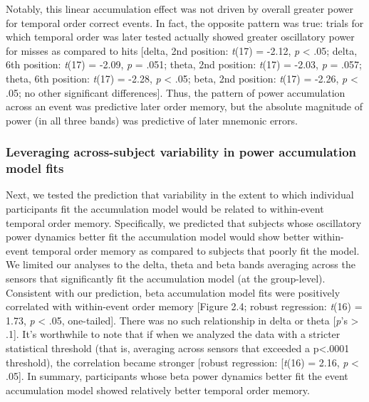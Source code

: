 Notably, this linear accumulation effect was not driven by overall
greater power for temporal order correct events. In fact, the opposite
pattern was true: trials for which temporal order was later tested
actually showed greater oscillatory power for misses as compared to hits
{[}delta, 2nd position: \emph{t}(17) = -2.12, \emph{p} \textless{} .05;
delta, 6th position: \emph{t}(17) = -2.09, \emph{p} = .051; theta, 2nd
position: \emph{t}(17) = -2.03, \emph{p} = .057; theta, 6th position:
\emph{t}(17) = -2.28, \emph{p} \textless{} .05; beta, 2nd position:
\emph{t}(17) = -2.26, \emph{p} \textless{} .05; no other significant
differences{]}. Thus, the pattern of power accumulation across an event
was predictive later order memory, but the absolute magnitude of power
(in all three bands) was predictive of later mnemonic errors.

\subsubsection{Leveraging across-subject variability in power
accumulation model
fits}\label{leveraging-across-subject-variability-in-power-accumulation-model-fits}

Next, we tested the prediction that variability in the extent to which
individual participants fit the accumulation model would be related to
within-event temporal order memory. Specifically, we predicted that
subjects whose oscillatory power dynamics better fit the accumulation
model would show better within-event temporal order memory as compared
to subjects that poorly fit the model. We limited our analyses to the
delta, theta and beta bands averaging across the sensors that
significantly fit the accumulation model (at the group-level).
Consistent with our prediction, beta accumulation model fits were
positively correlated with within-event order memory {[}Figure 2.4;
robust regression: \emph{t}(16) = 1.73, \emph{p} \textless{} .05,
one-tailed{]}. There was no such relationship in delta or theta
{[}\emph{p}'s \textgreater{} .1{]}. It's worthwhile to note that if when
we analyzed the data with a stricter statistical threshold (that is,
averaging across sensors that exceeded a p\textless{}.0001 threshold),
the correlation became stronger {[}robust regression: {[}\emph{t}(16) =
2.16, \emph{p} \textless{} .05{]}. In summary, participants whose beta
power dynamics better fit the event accumulation model showed relatively
better temporal order memory.

